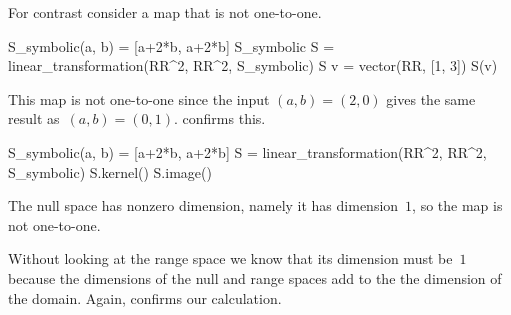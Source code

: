 For contrast consider a map that is not one-to-one.
\begin{sageoutput}[s,8,68,62;s,9,70,62]
S_symbolic(a, b) = [a+2*b, a+2*b]
S_symbolic
S = linear_transformation(RR^2, RR^2, S_symbolic)
S
v = vector(RR, [1, 3])  
S(v)
\end{sageoutput}
This map is not one-to-one since the input $(a,b)=(2,0)$  gives
the same result as~$(a,b)=(0,1)$.  
\Sage{} confirms this.
\begin{sageoutput}[d,0,2;s,3,69,58;s,7,70,59]
S_symbolic(a, b) = [a+2*b, a+2*b]
S = linear_transformation(RR^2, RR^2, S_symbolic)
S.kernel()
S.image()
\end{sageoutput}
The null space has nonzero dimension, namely it 
has dimension~$1$,
so the map is not one-to-one.

Without looking at the range space we know that its dimension must be~$1$ 
because the dimensions of the null and range spaces add to the
the dimension of the domain.
Again, \Sage{} confirms our calculation.



